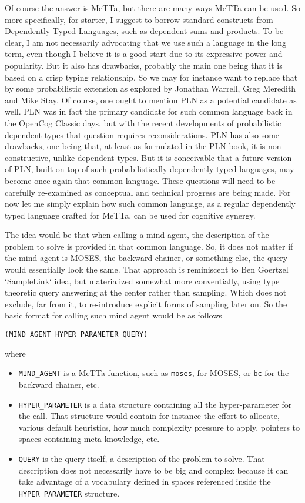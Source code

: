 \documentclass[]{report}
\begin{document}
Of course the answer is MeTTa, but there are many ways MeTTa can be
used.  So more specifically, for starter, I suggest to borrow standard
constructs from Dependently Typed Languages, such as dependent sums
and products.  To be clear, I am not necessarily advocating that we
use such a language in the long term, even though I believe it is a
good start due to its expressive power and popularity.  But it also
has drawbacks, probably the main one being that it is based on a crisp
typing relationship.  So we may for instance want to replace that by
some probabilistic extension as explored by Jonathan Warrell, Greg
Meredith and Mike Stay.  Of course, one ought to mention PLN as a
potential candidate as well.  PLN was in fact the primary candidate
for such common language back in the OpenCog Classic days, but with
the recent developments of probabilistic dependent types that question
requires reconsiderations.  PLN has also some drawbacks, one being
that, at least as formulated in the PLN book, it is non-constructive,
unlike dependent types.  But it is conceivable that a future version
of PLN, built on top of such probabilistically dependently typed
languages, may become once again that common language.  These
questions will need to be carefully re-examined as conceptual and
technical progress are being made.  For now let me simply explain how
such common language, as a regular dependently typed language crafted
for MeTTa, can be used for cognitive synergy.

The idea would be that when calling a mind-agent, the description of
the problem to solve is provided in that common language.  So, it does
not matter if the mind agent is MOSES, the backward chainer, or
something else, the query would essentially look the same.  That
approach is reminiscent to Ben Goertzel `SampleLink` idea, but
materialized somewhat more conventially, using type theoretic query
answering at the center rather than sampling.  Which does not exclude,
far from it, to re-introduce explicit forms of sampling later on.  So
the basic format for calling such mind agent would be as follows

\begin{verbatim}
(MIND_AGENT HYPER_PARAMETER QUERY)
\end{verbatim}
where
\begin{itemize}
\item \texttt{MIND_AGENT} is a MeTTa function, such as \texttt{moses},
for MOSES, or \texttt{bc} for the backward chainer, etc.
\item \texttt{HYPER_PARAMETER} is a data structure containing all the
  hyper-parameter for the call.  That structure would contain for
  instance the effort to allocate, various default heuristics, how
  much complexity pressure to apply, pointers to spaces containing
  meta-knowledge, etc.
\item \texttt{QUERY} is the query itself, a description of the problem to
  solve.  That description does not necessarily have to be big and
  complex because it can take advantage of a vocabulary defined in
  spaces referenced inside the \texttt{HYPER_PARAMETER} structure.
\end{itemize}
\end{document}
